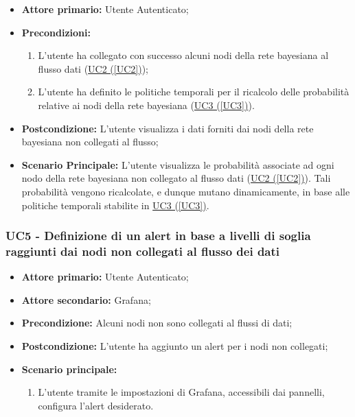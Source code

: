 \begin{itemize}
\item \textbf{Attore primario:} Utente Autenticato;
\item \textbf{Precondizioni:}
	\begin{enumerate}
	\item L'utente ha collegato con successo alcuni nodi della rete bayesiana al flusso dati (\hyperref[UC2]{UC2 (\ref*{UC2})});
	\item L'utente ha definito le politiche temporali per il ricalcolo delle probabilità relative ai nodi della rete bayesiana (\hyperref[UC3]{UC3 (\ref*{UC3})}).
	\end{enumerate}
\item \textbf{Postcondizione:} L'utente visualizza i dati forniti dai nodi della rete bayesiana non collegati al flusso;
\item \textbf{Scenario Principale:} L'utente visualizza le probabilità associate ad ogni nodo della rete bayesiana non collegato al flusso dati (\hyperref[UC2]{UC2 (\ref*{UC2})}). Tali probabilità vengono ricalcolate, e dunque mutano dinamicamente, in base alle politiche temporali stabilite in \hyperref[UC3]{UC3 (\ref*{UC3})}.
\end{itemize}

\pagebreak

\subsubsection{UC5 - Definizione di un alert in base a livelli di soglia raggiunti dai nodi non collegati al flusso dei dati}\label{UC5}
\begin{itemize}
	\item \textbf{Attore primario:} Utente Autenticato;
	\item \textbf{Attore secondario:} Grafana;
	\item \textbf{Precondizione:} Alcuni nodi non sono collegati al flussi di dati;
	\item \textbf{Postcondizione:} L'utente ha aggiunto un alert per i nodi non collegati;
	\item \textbf{Scenario principale:}
	\begin{enumerate}
		\item L'utente tramite le impostazioni di Grafana, accessibili dai pannelli, configura l'alert desiderato.
	\end{enumerate}
\end{itemize}

